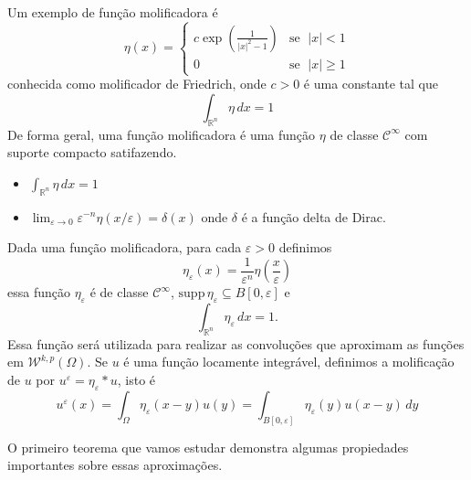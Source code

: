 \documentclass[a4paper, 11pt]{book}
\theoremstyle{definition}
\newcommand{\bR}{\mathbb{R}}
\newcommand{\cC}{\mathcal{C}}
\newcommand{\cW}{\mathcal{W}}
\newcommand{\supp}{\mathrm{supp}\,}
\begin{document}
Um exemplo de função molificadora é
\begin{equation} \label{eq:molificador-friedrich}
    \eta(x) =
    \left\{
        \begin{array}{lr}
            c \exp \left( \frac{1}{|x|^2 - 1} \right) & \text{se }\; |x| < 1\\
            0 & \text{se }\; |x| \geqslant 1
        \end{array}
    \right.
\end{equation}
conhecida como molificador de Friedrich, onde $c > 0$ é uma constante tal que
\[
    \int_{\bR^n} \eta \,dx = 1
\]
De forma geral, uma função molificadora é uma função $\eta$ de classe $\cC^\infty$ com suporte compacto satifazendo. 
\begin{itemize}
    \item $\displaystyle \int_{\bR^n} \eta \,dx = 1$
    \item $\displaystyle \lim_{\varepsilon \to 0} \varepsilon^{-n}\eta(x/\varepsilon) = \delta(x)$ onde $\delta$ é a função delta de Dirac.
\end{itemize}
Dada uma função molificadora, para cada $\varepsilon > 0$ definimos
\begin{equation} \label{eq:eta-epsilon}
    \eta_\varepsilon(x) = \frac{1}{\varepsilon^n} \eta\left( \frac{x}{\varepsilon} \right)
\end{equation}
essa função $\eta_\varepsilon$ é de classe $\cC^\infty$, $\supp \eta_\varepsilon \subseteq B[0,\varepsilon]$ e
\[
    \int_{\bR^n} \eta_\varepsilon \,dx = 1.
\]
Essa função será utilizada para realizar as convoluções que aproximam as funções em $\cW^{k,p}(\Omega)$. Se $u$ é uma função locamente integrável, definimos a molificação de $u$ por $u^\varepsilon = \eta_\varepsilon * u$, isto é
\[
    u^\varepsilon(x) = \int_\Omega \eta_\varepsilon(x-y) u(y) = \int_{B[0,\varepsilon]} \eta_\varepsilon(y) u(x-y) \,dy
\]

O primeiro teorema que vamos estudar demonstra algumas propiedades importantes sobre essas aproximações.
\end{document}
